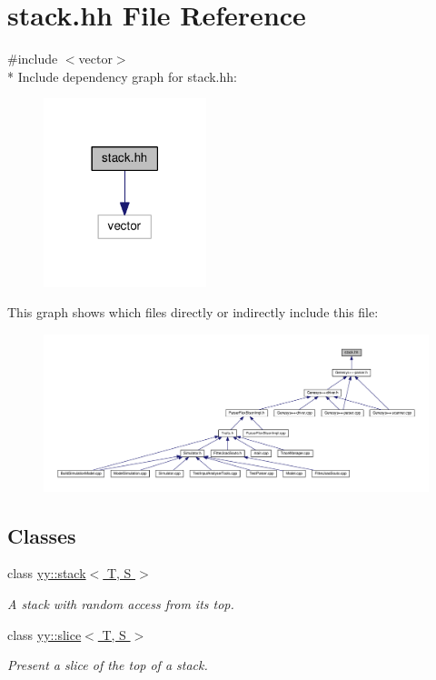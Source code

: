 \hypertarget{stack_8hh}{\section{stack.\-hh File Reference}
\label{stack_8hh}
}
{\ttfamily \#include $<$vector$>$}\\*
Include dependency graph for stack.\-hh\-:
\nopagebreak
\begin{figure}[H]
\begin{center}
\leavevmode
\includegraphics[width=134pt]{stack_8hh__incl}
\end{center}
\end{figure}
This graph shows which files directly or indirectly include this file\-:
\nopagebreak
\begin{figure}[H]
\begin{center}
\leavevmode
\includegraphics[width=350pt]{stack_8hh__dep__incl}
\end{center}
\end{figure}
\subsection*{Classes}
\begin{DoxyCompactItemize}
\item 
class \hyperlink{classyy_1_1stack}{yy\-::stack$<$ T, S $>$}
\begin{DoxyCompactList}\small\item\em A stack with random access from its top. \end{DoxyCompactList}\item 
class \hyperlink{classyy_1_1slice}{yy\-::slice$<$ T, S $>$}
\begin{DoxyCompactList}\small\item\em Present a slice of the top of a stack. \end{DoxyCompactList}\end{DoxyCompactItemize}
